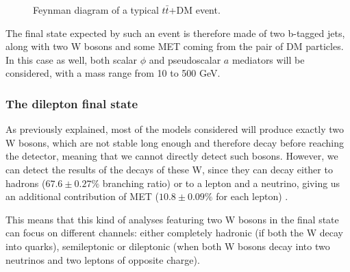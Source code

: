 \documentclass[a4paper, 10pt, openright]{report}
\begin{document}
\begin{figure}[htbp]
\begin{center}
\caption{Feynman diagram of a typical $t \bar t$+DM event.}
\label{fig:ttDMFeynman}
\end{center}
\end{figure}

The final state expected by such an event is therefore made of two b-tagged jets, along with two W bosons and some \ac{MET} coming from the pair of \ac{DM} particles. In this case as well, both scalar $\phi$ and pseudoscalar $a$ mediators will be considered, with a mass range from 10 to 500 GeV.

\subsubsection{The dilepton final state} \label{subsection:diLeptonFS}

As previously explained, most of the models considered will produce exactly two W bosons, which are not stable long enough and therefore decay before reaching the detector, meaning that we cannot directly detect such bosons. However, we can detect the results of the decays of these W, since they can decay either to hadrons ($67.6 \pm 0.27 \%$ branching ratio) or to a lepton and a neutrino, giving us an additional contribution of \ac{MET} ($10.8 \pm 0.09 \%$ for each lepton) \cite{PDG}.

This means that this kind of analyses featuring two W bosons in the final state can focus on different channels: either completely hadronic (if both the W decay into quarks), semileptonic or dileptonic (when both W bosons decay into two neutrinos and two leptons of opposite charge). 
\end{document}
